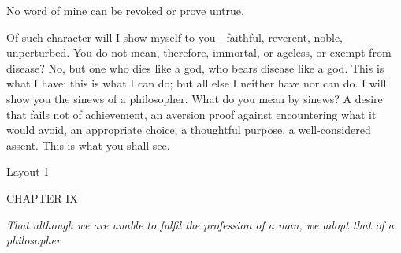 No word of mine can be revoked or prove untrue.

Of such character will I show myself to you—faithful, reverent, noble, unperturbed. You do not mean, therefore, immortal, or ageless, or exempt from disease? No, but one who dies like a god, who bears disease like a god. This is what I have; this is what I can do; but all else I neither have nor can do. I will show you the sinews of a philosopher. What do you mean by sinews? A desire that fails not of achievement, an aversion proof against encountering what it would avoid, an appropriate choice, a thoughtful purpose, a well-considered assent. This is what you shall see.



Layout 1

CHAPTER IX

\emph{That although we are unable to fulfil the profession of a man, we adopt that of a philosopher}

